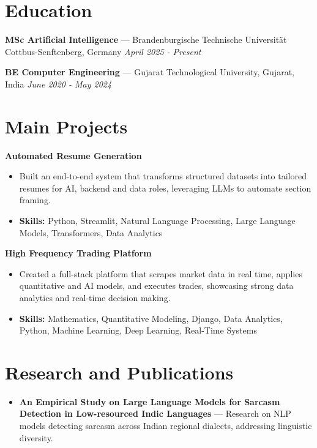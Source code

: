 \documentclass[a4paper,10pt]{article}
\begin{document}
\section*{Education}
\textbf{MSc Artificial Intelligence} — Brandenburgische Technische Universität Cottbus-Senftenberg, Germany \hfill \textit{April 2025 - Present}\par
\vspace{1.5pt}
\textbf{BE Computer Engineering} — Gujarat Technological University, Gujarat, India \hfill \textit{June 2020 - May 2024}\par

\section*{Main Projects}
\textbf{Automated Resume Generation}\par
\vspace{1pt}
\begin{itemize}
  \item Built an end-to-end system that transforms structured datasets into tailored resumes for AI, backend and data roles, leveraging LLMs to automate section framing.
  \item \textbf{Skills:} Python, Streamlit, Natural Language Processing, Large Language Models, Transformers, Data Analytics
\end{itemize}
\vspace{3pt}
\textbf{High Frequency Trading Platform}\par
\vspace{1pt}
\begin{itemize}
  \item Created a full-stack platform that scrapes market data in real time, applies quantitative and AI models, and executes trades, showcasing strong data analytics and real-time decision making.
  \item \textbf{Skills:} Mathematics, Quantitative Modeling, Django, Data Analytics, Python, Machine Learning, Deep Learning, Real-Time Systems
\end{itemize}

\section*{Research and Publications}
\begin{itemize}
\item \textbf{An Empirical Study on Large Language Models for Sarcasm Detection in Low-resourced Indic Languages} — Research on NLP models detecting sarcasm across Indian regional dialects, addressing linguistic diversity.
\end{itemize}
\end{document}
